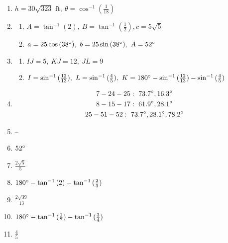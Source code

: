 \documentclass{article}
\begin{document}
\begin{enumerate}
\item $h = 30\sqrt{323} \text{ ft}, \ \theta = \cos^{-1}{(\frac{1}{18})}$

\item

	\begin{enumerate}
	
	\item $A = \tan^{-1}{(2)}, \ B = \tan^{-1}{(\frac{1}{2})}, c = 5\sqrt{5}$
	
	\item $a = 25\cos{(38\degree)}, \ b = 25\sin{(38\degree)}, \ A = 52\degree$
	
	\end{enumerate}
	
\item

	\begin{enumerate}
	
	\item $IJ = 5, \ KJ = 12, \ JL = 9$
	
	\item $I = \sin^{-1}{(\frac{12}{13})}, \ L = \sin^{-1}{(\frac{4}{5})}, \ K = 180\degree - \sin^{-1}{(\frac{12}{13})} - \sin^{-1}{(\frac{4}{5})}$
	
	\end{enumerate}
	
\item \begin{gather*}
	7-24-25: \ 73.7\degree, 16.3\degree \\
	8-15-17: \ 61.9\degree, 28.1\degree \\
	25-51-52: \ 73.7\degree, 28.1\degree, 78.2\degree
	\end{gather*}
	
\item --

\item $52\degree$

\item $\frac{2\sqrt{5}}{5}$

\item $180\degree - \tan^{-1}{(2)} - \tan^{-1}{(\frac{2}{3})}$

\item $\frac{2\sqrt{39}}{13}$

\item $180\degree - \tan^{-1}{(\frac{1}{7})} - \tan^{-1}{(\frac{3}{4})}$

\item $\frac{4}{5}$


\end{enumerate}
\end{document}
